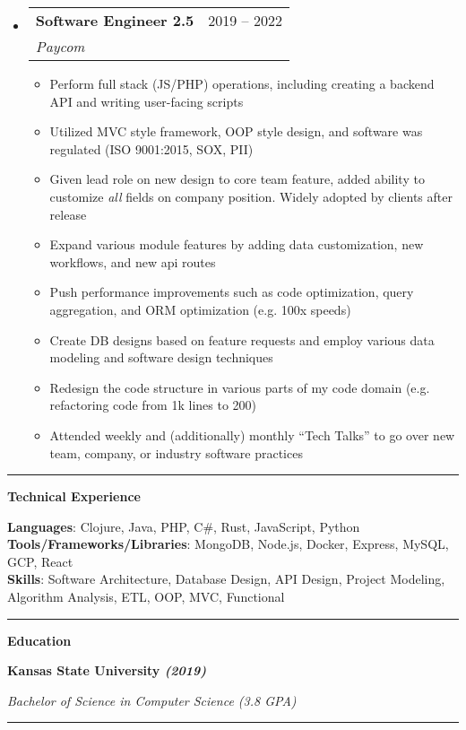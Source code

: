 \documentclass[letterpaper,11pt]{article}
\makeatletter
\newcommand{\resumeItem}[1]{
  \item\small{
    {#1 \vspace{-2pt}}
  }
}
\newcommand{\resumeSubheading}[4]{
  \vspace{-2pt}\item
    \begin{tabular*}{0.97\textwidth}[t]{l@{\extracolsep{\fill}}r}
      \textbf{#1} & #2 \\
      \textit{\small#3} & \textit{\small #4} \\
    \end{tabular*}\vspace{0pt}
}
\newcommand{\resumeSubHeadingListStart}{\begin{itemize}[leftmargin=0.15cm, label={}]}
\newcommand{\resumeSubHeadingListEnd}{\end{itemize}}
\newcommand{\resumeItemListStart}{\begin{itemize}}
\newcommand{\resumeItemListEnd}{\end{itemize}\vspace{-5pt}}
\makeatother
\begin{document}
\resumeSubHeadingListStart
    \resumeSubheading
      {Software Engineer 2.5}{2019 – 2022}
      {Paycom}{}
      \resumeItemListStart
          \resumeItem{
          Perform full stack (JS/PHP) operations, including creating a backend API and writing user-facing scripts}
          \resumeItem{
          Utilized MVC style framework, OOP style design, and software was regulated (ISO 9001:2015, SOX, PII)}
          \resumeItem{ Given lead role on new design to core team feature, added ability to customize \textit{all} fields on company position. Widely adopted by clients after release }
          \resumeItem{
          Expand various module features by adding data customization, new workflows, and new api routes}
          \resumeItem{Push performance improvements such as code optimization, query aggregation, and ORM optimization (e.g. 100x speeds)}
          \resumeItem{
          Create DB designs based on feature requests and employ various data modeling and software design techniques}
          \resumeItem{
        Redesign the code structure in various parts of my code domain (e.g. refactoring code from 1k lines to 200)}
          \resumeItem{
          Attended weekly and (additionally) monthly “Tech Talks” to go over new team, company, or industry software practices}
      \resumeItemListEnd
\resumeSubHeadingListEnd
\noindent\rule{19.5cm}{0.4pt}

%
\textbf{\large Technical Experience }

\textbf{ Languages}{: Clojure, Java, PHP, C\#, Rust, JavaScript, Python } \\

\textbf{ Tools/Frameworks/Libraries}{: MongoDB, Node.js, Docker, Express, MySQL, GCP, React } \\

\textbf{ Skills}{: }
Software Architecture, Database Design, API Design, Project Modeling, Algorithm Analysis, ETL, OOP, MVC, Functional

\noindent\rule{19.5cm}{0.4pt}

\textbf{\large Education }

\begin{minipage}[t]{0.45\textwidth}
    \raggedright
    \textbf{ Kansas State University \textit{(2019)}} \\
\end{minipage}
\hfill
\begin{minipage}[t]{0.45\textwidth}
    \raggedleft
    \textit{Bachelor of Science in Computer Science (3.8 GPA)} \\
\end{minipage}
\noindent\rule{19.5cm}{0.4pt}
\end{document}
